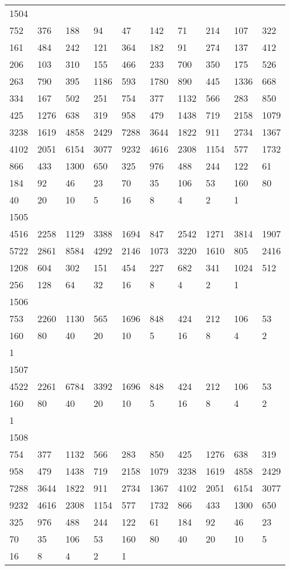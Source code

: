 \begin{longtable}{*{10}{l}}
1504&&&&&&&&&\\
752& 376& 188& 94& 47& 142& 71& 214& 107& 322\\
161& 484& 242& 121& 364& 182& 91& 274& 137& 412\\
206& 103& 310& 155& 466& 233& 700& 350& 175& 526\\
263& 790& 395& 1186& 593& 1780& 890& 445& 1336& 668\\
334& 167& 502& 251& 754& 377& 1132& 566& 283& 850\\
425& 1276& 638& 319& 958& 479& 1438& 719& 2158& 1079\\
3238& 1619& 4858& 2429& 7288& 3644& 1822& 911& 2734& 1367\\
4102& 2051& 6154& 3077& 9232& 4616& 2308& 1154& 577& 1732\\
866& 433& 1300& 650& 325& 976& 488& 244& 122& 61\\
184& 92& 46& 23& 70& 35& 106& 53& 160& 80\\
40& 20& 10& 5& 16& 8& 4& 2& 1& \\

1505&&&&&&&&&\\
4516& 2258& 1129& 3388& 1694& 847& 2542& 1271& 3814& 1907\\
5722& 2861& 8584& 4292& 2146& 1073& 3220& 1610& 805& 2416\\
1208& 604& 302& 151& 454& 227& 682& 341& 1024& 512\\
256& 128& 64& 32& 16& 8& 4& 2& 1& \\

1506&&&&&&&&&\\
753& 2260& 1130& 565& 1696& 848& 424& 212& 106& 53\\
160& 80& 40& 20& 10& 5& 16& 8& 4& 2\\
1& \\

1507&&&&&&&&&\\
4522& 2261& 6784& 3392& 1696& 848& 424& 212& 106& 53\\
160& 80& 40& 20& 10& 5& 16& 8& 4& 2\\
1& \\

1508&&&&&&&&&\\
754& 377& 1132& 566& 283& 850& 425& 1276& 638& 319\\
958& 479& 1438& 719& 2158& 1079& 3238& 1619& 4858& 2429\\
7288& 3644& 1822& 911& 2734& 1367& 4102& 2051& 6154& 3077\\
9232& 4616& 2308& 1154& 577& 1732& 866& 433& 1300& 650\\
325& 976& 488& 244& 122& 61& 184& 92& 46& 23\\
70& 35& 106& 53& 160& 80& 40& 20& 10& 5\\
16& 8& 4& 2& 1& \\


\end{longtable}

